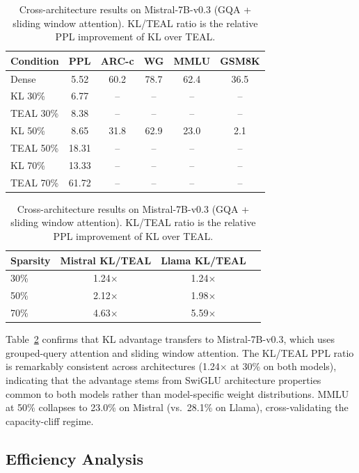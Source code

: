\documentclass[11pt,a4paper]{article}
\begin{document}
\begin{table}[t]
\centering
\caption{Cross-architecture results on Mistral-7B-v0.3 (GQA + sliding window attention). KL/TEAL ratio is the relative PPL improvement of KL over TEAL.}
\label{tab:mistral}
\small
\begin{tabular}{lccccc}
\toprule
\textbf{Condition} & \textbf{PPL} & \textbf{ARC-c} & \textbf{WG} & \textbf{MMLU} & \textbf{GSM8K} \\
\midrule
Dense & 5.52 & 60.2 & 78.7 & 62.4 & 36.5 \\
\midrule
KL 30\% & 6.77 & -- & -- & -- & -- \\
TEAL 30\% & 8.38 & -- & -- & -- & -- \\
\midrule
KL 50\% & 8.65 & 31.8 & 62.9 & 23.0 & 2.1 \\
TEAL 50\% & 18.31 & -- & -- & -- & -- \\
\midrule
KL 70\% & 13.33 & -- & -- & -- & -- \\
TEAL 70\% & 61.72 & -- & -- & -- & -- \\
\bottomrule
\end{tabular}

\vspace{0.5em}
\begin{tabular}{lccc}
\toprule
\textbf{Sparsity} & \textbf{Mistral KL/TEAL} & \textbf{Llama KL/TEAL} \\
\midrule
30\% & 1.24$\times$ & 1.24$\times$ \\
50\% & 2.12$\times$ & 1.98$\times$ \\
70\% & 4.63$\times$ & 5.59$\times$ \\
\bottomrule
\end{tabular}
\end{table}

Table~\ref{tab:mistral} confirms that KL advantage transfers to Mistral-7B-v0.3, which uses grouped-query attention and sliding window attention. The KL/TEAL PPL ratio is remarkably consistent across architectures (1.24$\times$ at 30\% on both models), indicating that the advantage stems from SwiGLU architecture properties common to both models rather than model-specific weight distributions. MMLU at 50\% collapses to 23.0\% on Mistral (vs.\ 28.1\% on Llama), cross-validating the capacity-cliff regime.

\subsection{Efficiency Analysis}
\end{document}
